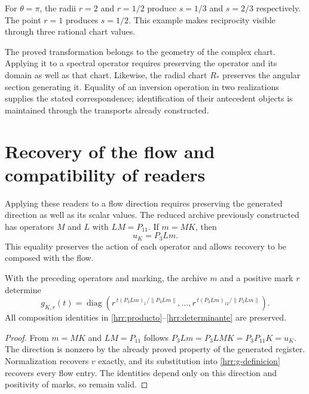 For \(\theta=\pi\), the radii \(r=2\) and \(r=1/2\) produce \(s=1/3\) and \(s=2/3\) respectively. The point \(r=1\) produces \(s=1/2\). This example makes reciprocity visible through three rational chart values.

The proved transformation belongs to the geometry of the complex chart. Applying it to a spectral operator requires preserving the operator and its domain as well as that chart. Likewise, the radial chart \(R_*\) preserves the angular section generating it. Equality of an inversion operation in two realizations supplies the stated correspondence; identification of their antecedent objects is maintained through the transports already constructed.

\section{Recovery of the flow and compatibility of readers}
\label{hrr:archivo}

Applying these readers to a flow direction requires preserving the generated direction as well as its scalar values. The reduced archive previously constructed has operators \(M\) and \(L\) with \(LM=P_{11}\). If \(m=MK\), then
\begin{equation}
 u_K=P_3Lm.
 \label{hrr:archivo-direccion}
\end{equation}
This equality preserves the action of each operator and allows recovery to be composed with the flow.

\begin{proposition}
\label{hrr:archivo-flujo} With the preceding operators and marking, the archive \(m\) and a positive mark \(r\) determine
\[
 g_{K,r}(t)=
 \operatorname{diag}\left(
 r^{\,t(P_3Lm)_1/\|P_3Lm\|},\ldots,
 r^{\,t(P_3Lm)_{12}/\|P_3Lm\|}\right).
\]
All composition identities in \eqref{hrr:producto}--\eqref{hrr:determinante} are preserved.
\end{proposition}
\begin{proof}
From \(m=MK\) and \(LM=P_{11}\) follows \(P_3Lm=P_3LMK=P_3P_{11}K=u_K\). The direction is nonzero by the already proved property of the generated register. Normalization recovers \(v\) exactly, and its substitution into \eqref{hrr:g-definicion} recovers every flow entry. The identities depend only on this direction and positivity of marks, so remain valid.
\end{proof}


